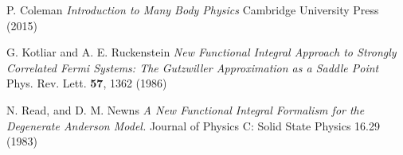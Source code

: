 \documentclass[12pt]{article}
\begin{document}


\begin{thebibliography}{1}

P. Coleman
\emph{Introduction to Many Body Physics}
Cambridge University Press (2015)

G. Kotliar and A. E. Ruckenstein
\emph{New Functional Integral Approach to Strongly Correlated Fermi Systems: The Gutzwiller Approximation as a Saddle Point}
Phys. Rev. Lett. \textbf{57}, 1362 (1986)

N. Read, and D. M. Newns
\emph{A New Functional Integral Formalism for the Degenerate Anderson Model.} Journal of Physics C: Solid State Physics 16.29 (1983)


\end{thebibliography}
\end{document}
